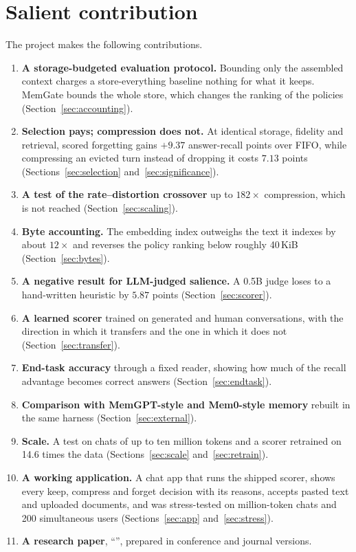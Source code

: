 \section{Salient contribution}

The project makes the following contributions.
\begin{enumerate}
\item \textbf{A storage-budgeted evaluation protocol.} Bounding only the
  assembled context charges a store-everything baseline nothing for what it
  keeps. MemGate bounds the whole store, which changes the ranking of the
  policies (Section~\ref{sec:accounting}).
\item \textbf{Selection pays; compression does not.} At identical storage,
  fidelity and retrieval, scored forgetting gains $+9.37$ answer-recall points
  over FIFO, while compressing an evicted turn instead of dropping it costs
  $7.13$ points (Sections~\ref{sec:selection} and~\ref{sec:significance}).
\item \textbf{A test of the rate--distortion crossover} up to $182\times$
  compression, which is not reached (Section~\ref{sec:scaling}).
\item \textbf{Byte accounting.} The embedding index outweighs the text it
  indexes by about $12\times$ and reverses the policy ranking below roughly
  40\,KiB (Section~\ref{sec:bytes}).
\item \textbf{A negative result for LLM-judged salience.} A 0.5B judge loses
  to a hand-written heuristic by $5.87$ points (Section~\ref{sec:scorer}).
\item \textbf{A learned scorer} trained on generated and human conversations,
  with the direction in which it transfers and the one in which it does not
  (Section~\ref{sec:transfer}).
\item \textbf{End-task accuracy} through a fixed reader, showing how much of
  the recall advantage becomes correct answers (Section~\ref{sec:endtask}).
\item \textbf{Comparison with MemGPT-style and Mem0-style memory} rebuilt in
  the same harness (Section~\ref{sec:external}).
\item \textbf{Scale.} A test on chats of up to ten million tokens and a scorer
  retrained on 14.6 times the data (Sections~\ref{sec:scale}
  and~\ref{sec:retrain}).
\item \textbf{A working application.} A chat app that runs the shipped scorer,
  shows every keep, compress and forget decision with its reasons, accepts
  pasted text and uploaded documents, and was stress-tested on million-token
  chats and 200 simultaneous users (Sections~\ref{sec:app}
  and~\ref{sec:stress}).
\item \textbf{A research paper}, ``\paperTitle'', prepared in conference and
  journal versions.
\end{enumerate}

